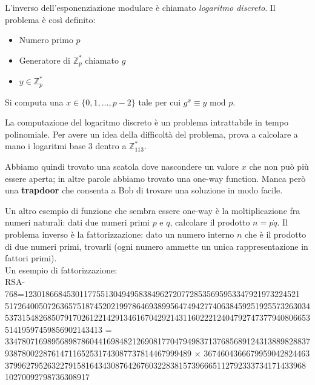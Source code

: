 \medskip

	\begin{algorithmic}
	\EndIf
	\EndFor
	\end{algorithmic}

\medskip

L'inverso dell'esponenziazione modulare è chiamato \textit{logaritmo discreto}.
Il problema è così definito:
\begin{itemize}
	\item Numero primo $p$
	\item Generatore di $\mathbb{Z}_p^*$ chiamato $g$
	\item $y \in \mathbb{Z}_p^*$
\end{itemize}
Si computa una $x \in \{0, 1, ..., p-2\}$ tale per cui $g^x \equiv y \text{ mod } p$.

La computazione del logaritmo discreto è un problema intrattabile in tempo polinomiale. Per avere un idea della difficoltà del problema, prova a calcolare a mano i logaritmi base 3 dentro a $\mathbb{Z}_{113}^*$.

Abbiamo quindi trovato una scatola dove nascondere un valore $x$ che non può più essere aperta; in altre parole abbiamo trovato una one-way function. Manca però una \textbf{trapdoor} che consenta a Bob di trovare una soluzione in modo facile.

Un altro esempio di funzione che sembra essere one-way è la moltiplicazione fra numeri naturali: dati due numeri primi $p$ e $q$, calcolare il prodotto $n = p \dot q$.
Il problema inverso è la fattorizzazione: dato un numero interno $n$ che è il prodotto di due numeri primi, trovarli (ogni numero ammette un unica rappresentazione in fattori primi).\\



Un esempio di fattorizzazione:\\



RSA-768=12301866845301177551304949583849627207728535695953347921973224521\\
517264005072636575187452021997864693899564749427740638459251925573263034\\
537315482685079170261221429134616704292143116022212404792747377940806653\\
51419597459856902143413 = \\
334780716989568987860441698482126908177047949837137685689124313889828837\\
93878002287614711652531743087737814467999489 × 3674604366679959042824463\\
37996279526322791581643430876426760322838157396665112792333734171433968\\
10270092798736308917


